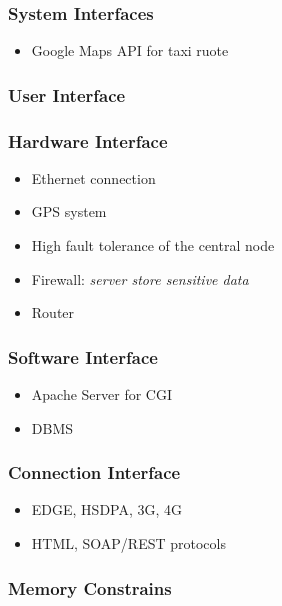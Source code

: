 \documentclass[english]{article}
\begin{document}
\subsubsection{System Interfaces}

\begin{itemize}
	\item Google Maps API for taxi ruote
\end{itemize}

\subsubsection{User Interface}


\subsubsection{Hardware Interface}

\begin{itemize}
	\item Ethernet connection
	\item GPS system
	\item High fault tolerance of the central node
	\item Firewall: \emph{server store sensitive data}
	\item Router
\end{itemize}

\subsubsection{Software Interface}

\begin{itemize}
	\item Apache Server for CGI
	\item DBMS
\end{itemize}

\subsubsection{Connection Interface}

\begin{itemize}
	\item EDGE, HSDPA, 3G, 4G
	\item HTML, SOAP/REST protocols
\end{itemize}

\subsubsection{Memory Constrains}
\end{document}
